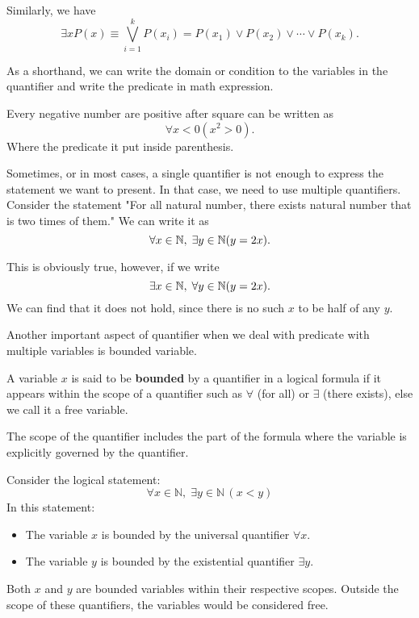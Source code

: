 Similarly, we have 
\[\exists x P(x) \equiv \bigvee_{i=1}^{k} P(x_i) = P(x_1)\lor P(x_2)\lor \cdots \lor P(x_k).\]


As a shorthand, we can write the domain or condition to the variables in the quantifier and write the predicate in math expression.
\begin{example}
    Every negative number are positive after square can be written as
    \[\forall x < 0 (x^2>0).\]
    Where the predicate it put inside parenthesis.
\end{example}

Sometimes, or in most cases, a single quantifier is not enough to express the statement we want to present. In that case, we need to use multiple quantifiers. Consider the statement "For all natural number, there exists natural number that is two times of them." We can write it as
\[\forall x\in \mathbb{N}, \; \exists y \in \mathbb{N}(y=2x).\]

This is obviously true, however, if we write
\[\exists  x\in \mathbb{N}, \; \forall y \in \mathbb{N}(y=2x).\]
We can find that it does not hold, since there is no such $x$ to be half of any $y$.

Another important aspect of quantifier when we deal with predicate with multiple variables is bounded variable.
\begin{definition}
    A variable \( x \) is said to be \textbf{bounded} by a quantifier in a logical formula if it appears within the scope of a quantifier such as \(\forall\) (for all) or \(\exists\) (there exists), else we call it a free variable. 

The scope of the quantifier includes the part of the formula where the variable is explicitly governed by the quantifier.
\end{definition}

\begin{example}
Consider the logical statement:
\[ \forall x \in \mathbb{N}, \; \exists y \in \mathbb{N} \, (x < y) \]
In this statement:
\begin{itemize}
    \item The variable \( x \) is bounded by the universal quantifier \(\forall x\).
    \item The variable \( y \) is bounded by the existential quantifier \(\exists y\).
\end{itemize}
Both \( x \) and \( y \) are bounded variables within their respective scopes. Outside the scope of these quantifiers, the variables would be considered free.
\end{example}

